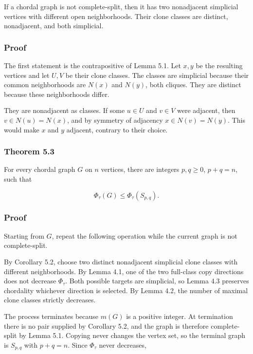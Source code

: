 \documentclass[
  11pt,
]{article}
\begin{document}
If a chordal graph is not complete-split, then it has two nonadjacent
simplicial vertices with different open neighborhoods. Their clone
classes are distinct, nonadjacent, and both simplicial.

\subsubsection{Proof}\label{proof-6}

The first statement is the contrapositive of Lemma 5.1. Let \(x,y\) be
the resulting vertices and let \(U,V\) be their clone classes. The
classes are simplicial because their common neighborhoods are \(N(x)\)
and \(N(y)\), both cliques. They are distinct because these
neighborhoods differ.

They are nonadjacent as classes. If some \(u\in U\) and \(v\in V\) were
adjacent, then \(v\in N(u)=N(x)\), and by symmetry of adjacency
\(x\in N(v)=N(y)\). This would make \(x\) and \(y\) adjacent, contrary
to their choice.

\subsubsection{Theorem 5.3}\label{theorem-5.3}

For every chordal graph \(G\) on \(n\) vertices, there are integers
\(p,q\ge0\), \(p+q=n\), such that

\[
\boxed{
\Phi_\tau(G)\le\Phi_\tau(S_{p,q}).
}
\]

\subsubsection{Proof}\label{proof-7}

Starting from \(G\), repeat the following operation while the current
graph is not complete-split.

By Corollary 5.2, choose two distinct nonadjacent simplicial clone
classes with different neighborhoods. By Lemma 4.1, one of the two
full-class copy directions does not decrease \(\Phi_\tau\). Both
possible targets are simplicial, so Lemma 4.3 preserves chordality
whichever direction is selected. By Lemma 4.2, the number of maximal
clone classes strictly decreases.

The process terminates because \(m(G)\) is a positive integer. At
termination there is no pair supplied by Corollary 5.2, and the graph is
therefore complete-split by Lemma 5.1. Copying never changes the vertex
set, so the terminal graph is \(S_{p,q}\) with \(p+q=n\). Since
\(\Phi_\tau\) never decreases,
\end{document}
